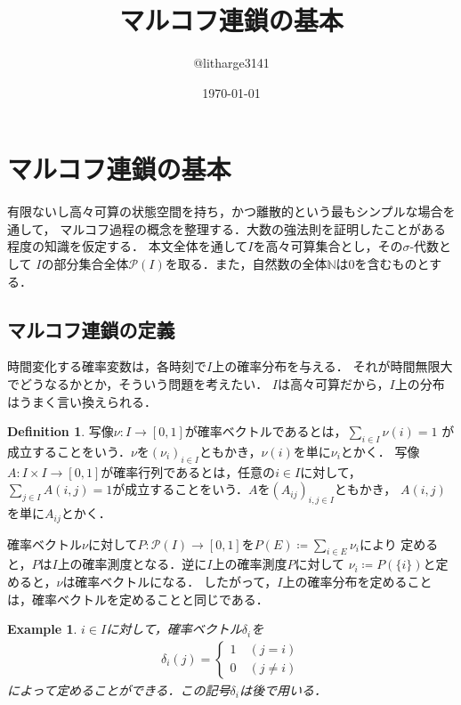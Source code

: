 \documentclass[dvipdfmx,autodetect-engine]{jsarticle}
\newtheorem{example}{Example}[section]
\theoremstyle{remark}
\theoremstyle{definition}
\newtheorem{definition}{Definition}[section]
\newcommand{\N}{\mathbb{N}}
\begin{document}
\title{マルコフ連鎖の基本}
\author{@litharge3141}
\date{\today}
\maketitle

\section{マルコフ連鎖の基本}
有限ないし高々可算の状態空間を持ち，かつ離散的という最もシンプルな場合を通して，
マルコフ過程の概念を整理する．大数の強法則を証明したことがある程度の知識を仮定する．
本文全体を通して$I$を高々可算集合とし，その$\sigma$-代数として
$I$の部分集合全体$\mathcal{P}(I)$を取る．また，自然数の全体$\N$は$0$を含むものとする．
\subsection{マルコフ連鎖の定義}
時間変化する確率変数は，各時刻で$I$上の確率分布を与える．
それが時間無限大でどうなるかとか，そういう問題を考えたい．
$I$は高々可算だから，$I$上の分布はうまく言い換えられる．


\begin{definition}
    写像$\nu \colon I \to [0,1]$が確率ベクトルであるとは，$\sum_{i\in I} \nu (i)=1$
    が成立することをいう．$\nu$を$(\nu_i)_{i\in I}$ともかき，$\nu(i)$を単に$\nu_i$とかく．
    写像$A\colon I\times I \to [0,1]$が確率行列であるとは，任意の$i\in I$に対して，
    $\sum_{j\in I} A(i,j) = 1$が成立することをいう．$A$を$(A_{ij})_{i,j\in I}$ともかき，
    $A(i,j)$を単に$A_{ij}$とかく．
\end{definition}


確率ベクトル$\nu$に対して$P\colon\mathcal{P}(I) \to [0,1]$を$P(E) \coloneqq \sum_{i \in E} \nu_i$により
定めると，$P$は$I$上の確率測度となる．逆に$I$上の確率測度$P$に対して
$\nu_i \coloneqq P(\{i\})$と定めると，$\nu$は確率ベクトルになる．
したがって，$I$上の確率分布を定めることは，確率ベクトルを定めることと同じである．

\begin{example}
    $i \in I$に対して，確率ベクトル$\delta_i$を
    \begin{align}
        \delta_i (j) = 
        \begin{cases}
            1 \quad (j=i) \\
            0 \quad (j\neq i)
        \end{cases}
    \end{align}
    によって定めることができる．この記号$\delta_i$は後で用いる．
\end{example}
\end{document}
